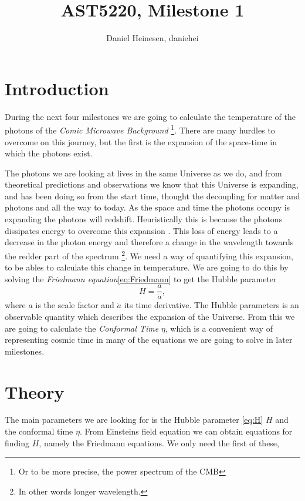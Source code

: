 \documentclass[a4paper,norsk, 10pt]{article}
\title{AST5220, Milestone 1}
\author{Daniel Heinesen, daniehei}
\begin{document}
\maketitle

\section{Introduction}
During the next four milestones we are going to calculate the temperature of the photons of the \textit{Comic Microwave Background} \footnote{Or to be more precise, the power spectrum of the CMB}. There are many hurdles to overcome on this journey, but the first is the expansion of the space-time in which the photons exist.

The photons we are looking at lives in the same Universe as we do, and from theoretical predictions and observations we know that this Universe is expanding, and has been doing so from the start time, thought the decoupling for matter and photons and all the way to today. As the space and time the photons occupy is expanding the photons will redshift. Heuristically this is because the photons dissipates energy to overcome this expansion . This loss of energy leads to a decrease in the photon energy and therefore a change in the wavelength towards the redder part of the spectrum \footnote{In other words longer wavelength.}. 
We need a way of quantifying this expansion, to be ables to calculate this change in temperature. We are going to do this by solving the \textit{Friedmann equation}\eqref{eq:Friedmann} to get the Hubble parameter
\begin{equation}\label{eq:H}
H = \frac{a}{\dot{a}},
\end{equation}
where $a$ is the scale factor and $\dot{a}$ its time derivative. The Hubble parameters is an observable quantity which describes the expansion of the Universe. From this we are going to calculate the \textit{Conformal Time} $\eta$, which is a convenient way of representing cosmic time in many of the equations we are going to solve in later milestones.


\section{Theory}
The main parameters we are looking for is the Hubble parameter \eqref{eq:H} $H$ and the conformal time $\eta$. From Einsteins field equation we can obtain equations for finding $H$, namely the Friedmann equations. We only need the first of these,
\end{document}
